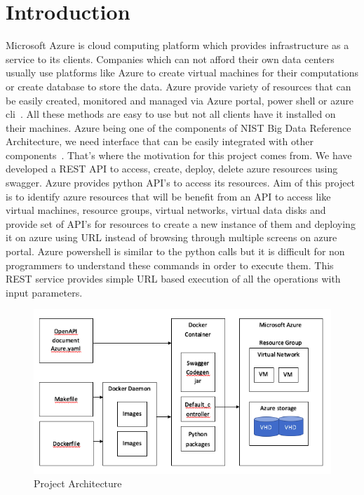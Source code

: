 

\maketitle

\section{Introduction}
Microsoft Azure is cloud computing platform which provides infrastructure as a
service to its clients. Companies which can not afford their own data centers
usually use platforms like Azure to create virtual machines for their
computations or create database to store the data. Azure provide variety of
resources that can be easily created, monitored and managed via Azure portal,
power shell or azure cli~\cite{hid-sp18-502-microsoft-azure}. All these methods
are easy to use but not all clients
have it installed on their machines. Azure being one of the components of NIST
Big Data Reference Architecture, we need interface that can be easily
integrated with other components~\cite{hid-sp18-502-nist-vol8}. That's where
the motivation for this project comes from. We have developed a REST API to
access, create, deploy, delete azure resources using swagger. Azure provides
python API's to access its resources. Aim of this project is to identify azure
resources that will be benefit from an API to access like virtual machines,
resource groups, virtual networks, virtual data disks and provide set
of API's for resources  to create a new instance of them and deploying it on
azure using URL instead of browsing through multiple screens on azure portal.
Azure powershell is similar to the python calls but it is difficult for non
programmers to understand these commands in order to execute them. This REST
service provides simple URL based execution of all the operations with input
parameters.

\begin{figure}[!ht]
        \centering\includegraphics[width=\columnwidth]
        {image/project-architecture.PNG}
        \caption{Project Architecture}\label{fig:project-architecture}
\end{figure}

